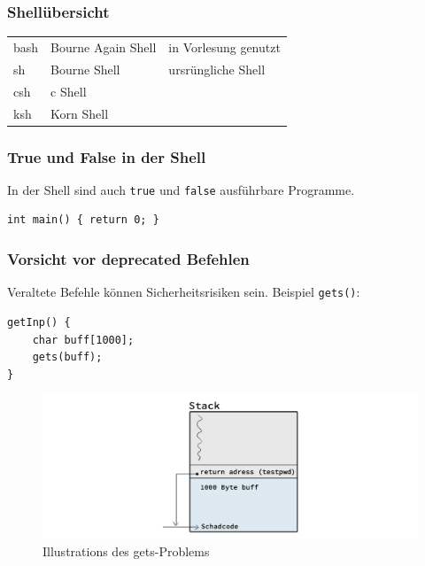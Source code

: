 
	\subsubsection*{Shellübersicht} %
	\label{ssub:shell_bersicht}
	
		\begin{tabular}{lll}
			bash	&	Bourne Again Shell 	&	in Vorlesung genutzt\\
			sh		&	Bourne Shell 		&	ursrüngliche Shell\\
			csh		&	c Shell 			&	\\
			ksh		&	Korn Shell 			&	
		\end{tabular}


	\subsubsection*{True und False in der Shell} %
	\label{ssub:true_und_false_in_der_shell}
	
		In der Shell sind auch \texttt{true} und \texttt{false} ausführbare Programme.
		\begin{lstlisting}
int main() { return 0; }
		\end{lstlisting}


	\subsubsection*{Vorsicht vor deprecated Befehlen} %
	\label{ssub:vorsicht_vor_deprecated_befehlen}
	
		Veraltete Befehle können Sicherheitsrisiken sein. Beispiel \texttt{gets()}:

		\lstCcode[testpwd.c]
		\begin{lstlisting}
getInp() {
	char buff[1000];
	gets(buff);
}
		\end{lstlisting}
		\begin{figure}[hbtp]
			\caption{Illustrations des gets-Problems}
			\includegraphics[width=\textwidth]{workfiles/v3_1}
		\end{figure}

